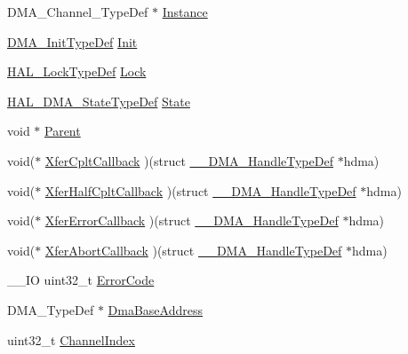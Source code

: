 \begin{DoxyCompactItemize}
\item 
D\+M\+A\+\_\+\+Channel\+\_\+\+Type\+Def $\ast$ \hyperlink{struct_____d_m_a___handle_type_def_adc5940b5bbf1fc712118cd40ff3ea69b}{Instance}
\item 
\hyperlink{struct_d_m_a___init_type_def}{D\+M\+A\+\_\+\+Init\+Type\+Def} \hyperlink{struct_____d_m_a___handle_type_def_a4352c7144ad5e1e4ab54a87d3be6eb62}{Init}
\item 
\hyperlink{stm32f1xx__hal__def_8h_ab367482e943333a1299294eadaad284b}{H\+A\+L\+\_\+\+Lock\+Type\+Def} \hyperlink{struct_____d_m_a___handle_type_def_ad4cf225029dbefe8d3fe660c33b8bb6b}{Lock}
\item 
\hyperlink{group___d_m_a___exported___types_ga9c012af359987a240826f29073bbe463}{H\+A\+L\+\_\+\+D\+M\+A\+\_\+\+State\+Type\+Def} \hyperlink{struct_____d_m_a___handle_type_def_ad41e111a28e868b2df5bbce9925cf42d}{State}
\item 
void $\ast$ \hyperlink{struct_____d_m_a___handle_type_def_a6ee5f2130887847bbc051932ea43b73d}{Parent}
\item 
void($\ast$ \hyperlink{struct_____d_m_a___handle_type_def_a62a5dfe04a3c53000f26d741e4a27ab4}{Xfer\+Cplt\+Callback} )(struct \hyperlink{struct_____d_m_a___handle_type_def}{\+\_\+\+\_\+\+D\+M\+A\+\_\+\+Handle\+Type\+Def} $\ast$hdma)
\item 
void($\ast$ \hyperlink{struct_____d_m_a___handle_type_def_afef2948f0688c22257a540f699e31720}{Xfer\+Half\+Cplt\+Callback} )(struct \hyperlink{struct_____d_m_a___handle_type_def}{\+\_\+\+\_\+\+D\+M\+A\+\_\+\+Handle\+Type\+Def} $\ast$hdma)
\item 
void($\ast$ \hyperlink{struct_____d_m_a___handle_type_def_a074ff1d4bf731a9cd85e554f1faec29b}{Xfer\+Error\+Callback} )(struct \hyperlink{struct_____d_m_a___handle_type_def}{\+\_\+\+\_\+\+D\+M\+A\+\_\+\+Handle\+Type\+Def} $\ast$hdma)
\item 
void($\ast$ \hyperlink{struct_____d_m_a___handle_type_def_a70376f061d856fdda49c8c23c9bb5b22}{Xfer\+Abort\+Callback} )(struct \hyperlink{struct_____d_m_a___handle_type_def}{\+\_\+\+\_\+\+D\+M\+A\+\_\+\+Handle\+Type\+Def} $\ast$hdma)
\item 
\+\_\+\+\_\+\+IO uint32\+\_\+t \hyperlink{struct_____d_m_a___handle_type_def_a123c5063e6a3b1901b2fbe5f88c53a7e}{Error\+Code}
\item 
D\+M\+A\+\_\+\+Type\+Def $\ast$ \hyperlink{struct_____d_m_a___handle_type_def_adaadecc05539a447843606e1e511d992}{Dma\+Base\+Address}
\item 
uint32\+\_\+t \hyperlink{struct_____d_m_a___handle_type_def_ae2d85e64eb57a8bccd3f70e74db09c31}{Channel\+Index}
\end{DoxyCompactItemize}


